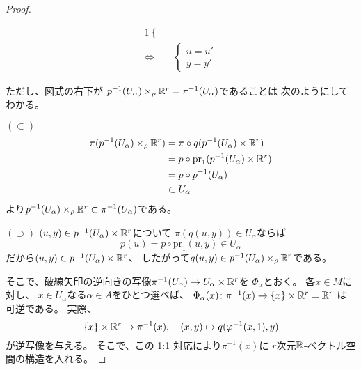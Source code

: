 \documentclass[report]{jlreq}
\begin{document}
\begin{proof}
\begin{innerproof}
\begin{alignat}{1}
\begin{cases}
                \end{cases} \\
            \iff
                &\begin{cases}
                    u = u' \\
                    y = y'
                \end{cases}
        \end{alignat}
    \end{innerproof}
    ただし、図式の右下が
    $p^{-1}(U_\alpha) \times_\rho \mathbb{R}^r = \pi^{-1}(U_\alpha)$であることは
    次のようにしてわかる。
    \begin{innerproof}
        $(\subset)$ \quad
        \begin{align}
            \pi(p^{-1}(U_\alpha) \times_\rho \mathbb{R}^r)
                &= \pi \circ q(p^{-1}(U_\alpha) \times \mathbb{R}^r) \\
                &= p \circ \mathrm{pr}_1 (p^{-1}(U_\alpha) \times \mathbb{R}^r) \\
                &= p \circ p^{-1}(U_\alpha) \\
                &\subset U_\alpha
        \end{align}
        より$p^{-1}(U_\alpha) \times_\rho \mathbb{R}^r \subset \pi^{-1}(U_\alpha)$である。

        \noindent
        $(\supset)$ \quad
        $(u, y) \in p^{-1}(U_\alpha) \times \mathbb{R}^r$について
        $\pi(q(u, y)) \in U_\alpha$ならば
        \begin{equation}
            p(u) = p \circ \mathrm{pr}_1(u, y) \in U_\alpha
        \end{equation}
        だから$(u, y) \in p^{-1}(U_\alpha) \times \mathbb{R}^r$、
        したがって$q(u, y) \in p^{-1}(U_\alpha) \times_\rho \mathbb{R}^r$である。
    \end{innerproof}
    そこで、破線矢印の逆向きの写像$\pi^{-1}(U_\alpha) \to U_\alpha \times \mathbb{R}^r$を
    $\Phi_\alpha$とおく。
    各$x \in M$に対し、
    $x \in U_\alpha$なる$\alpha \in A$をひとつ選べば、
    $\Phi_\alpha(x) \colon \pi^{-1}(x) \to \{ x \} \times \mathbb{R}^r = \mathbb{R}^r$
    は可逆である。
    実際、
    \begin{equation}
        \{ x \} \times \mathbb{R}^r \to \pi^{-1}(x),
        \quad
        (x, y) \mapsto q(\varphi^{-1}(x, 1), y)
    \end{equation}
    が逆写像を与える。
    そこで、この 1:1 対応により$\pi^{-1}(x)$に
    $r$次元$\mathbb{R}$-ベクトル空間の構造を入れる。


\end{proof}
\end{document}
